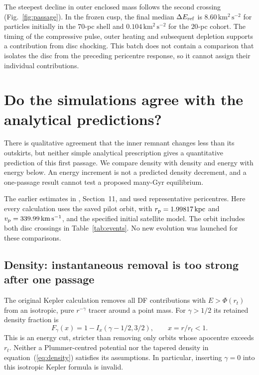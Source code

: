 \documentclass[11pt,a4paper]{article}
\newcommand{\kpc}{\,\mathrm{kpc}}
\newcommand{\kms}{\,\mathrm{km\,s^{-1}}}
\begin{document}
The steepest decline in outer enclosed mass follows the second crossing
(Fig.~\ref{fig:passage}). In the frozen cusp, the final median
$\Delta E_{\rm ref}$ is $8.60\,\mathrm{km^2\,s^{-2}}$ for particles initially
in the $70$-pc shell and $0.104\,\mathrm{km^2\,s^{-2}}$ for the $20$-pc
cohort. The timing of the compressive pulse, outer heating and subsequent
depletion supports a contribution from disc shocking. This batch does not
contain a comparison that isolates the disc from the preceding pericentre
response, so it cannot assign their individual contributions.

\FloatBarrier
\section{Do the simulations agree with the analytical predictions?}
\label{sec:analytics}

There is qualitative agreement that the inner remnant changes less than its
outskirts, but neither simple analytical prescription gives a quantitative
prediction of this first passage. We compare density with density and energy
with energy below. An energy increment is not a predicted density decrement,
and a one-passage result cannot test a proposed many-Gyr equilibrium.

The earlier estimates in , Section~11,
and  used representative pericentres. Here every
calculation uses the saved pilot orbit, with $r_{\rm p}=1.99817\kpc$ and
$v_{\rm p}=339.99\kms$, and the specified initial satellite model. The orbit
includes both disc crossings in Table~\ref{tab:events}. No new evolution was
launched for these comparisons.

\subsection{Density: instantaneous removal is too strong after one passage}

The original Kepler calculation removes all DF contributions with
$E>\Phi(r_t)$ from an isotropic, pure $r^{-\gamma}$ tracer around a point
mass. For $\gamma>1/2$ its retained density fraction is
\begin{equation}
 F_\gamma(x)=1-I_x(\gamma-1/2,3/2),\qquad x=r/r_t<1.
 \label{eq:kepler-cut}
\end{equation}
This is an energy cut, stricter than removing only orbits whose apocentre
exceeds $r_t$. Neither a Plummer-centred potential nor the tapered density
in equation~(\ref{eq:density}) satisfies its assumptions. In particular,
inserting $\gamma=0$ into this isotropic Kepler formula is invalid.
\end{document}
